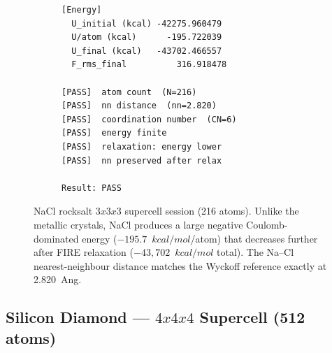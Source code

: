 \documentclass[11pt,twoside]{article}
\def\AA{Ang}%
\def\times{x}%
\def\kcalmol{kcal/mol}%
\newcommand{\kcalmol}{\text{kcal/mol}}
\begin{document}
\begin{figure}[H]
\begin{subfigure}[b]{0.50\textwidth}
\begin{lstlisting}[language={}, basicstyle=\ttfamily\scriptsize,
  frame=single, caption={Session: \texttt{xtal\_003\_nacl}}]
[Energy]
  U_initial (kcal) -42275.960479
  U/atom (kcal)      -195.722039
  U_final (kcal)   -43702.466557
  F_rms_final          316.918478

[PASS]  atom count  (N=216)
[PASS]  nn distance  (nn=2.820)
[PASS]  coordination number  (CN=6)
[PASS]  energy finite
[PASS]  relaxation: energy lower
[PASS]  nn preserved after relax

Result: PASS
\end{lstlisting}
\end{subfigure}
\caption{NaCl rocksalt $3{\times}3{\times}3$ supercell session (216 atoms). Unlike the metallic crystals, NaCl produces a large negative Coulomb-dominated energy ($-195.7$~$\kcalmol$/atom) that decreases further after FIRE relaxation ($-43{,}702$~$\kcalmol$ total). The Na--Cl nearest-neighbour distance matches the Wyckoff reference exactly at 2.820~\AA.}
\label{fig:nacl-session}
\end{figure}

\subsection{Silicon Diamond --- $4 \times 4 \times 4$ Supercell (512 atoms)}
\end{document}
